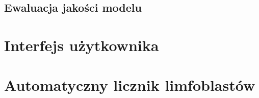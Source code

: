 



\subsection{Ewaluacja jakości modelu}


\section{Interfejs użytkownika}


\section{Automatyczny licznik limfoblastów}\label{sec:automatyczny-licznik-limfoblastow}

